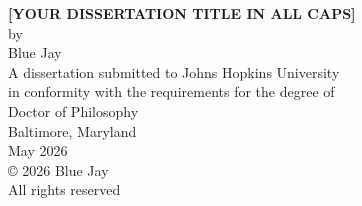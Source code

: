 \begin{titlepage}
\thispagestyle{empty}
\begin{center}
    \doublespacing
    \vspace*{10mm} 
    {\bf \Large [YOUR DISSERTATION TITLE IN ALL CAPS]} \\ 
    \vfill 
    {\large by \\  Blue Jay}\\
    \vfill
    {\large A dissertation submitted to Johns Hopkins University\\ in conformity with the requirements for the degree of\\ Doctor of Philosophy\\}
    \vfill
    {\large Baltimore, Maryland} \\
    {\large May 2026} \\
    \vfill
    {\large \copyright{} 2026 Blue Jay} \\ 
    {\large All rights reserved} \\ 
    \vfill
\end{center}
\newpage  
\end{titlepage}
